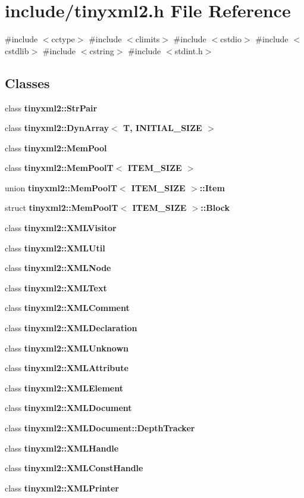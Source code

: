 \section{include/tinyxml2.h File Reference}
\label{tinyxml2_8h}
{\ttfamily \#include $<$cctype$>$}\newline
{\ttfamily \#include $<$climits$>$}\newline
{\ttfamily \#include $<$cstdio$>$}\newline
{\ttfamily \#include $<$cstdlib$>$}\newline
{\ttfamily \#include $<$cstring$>$}\newline
{\ttfamily \#include $<$stdint.\+h$>$}\newline
\subsection*{Classes}
\begin{DoxyCompactItemize}
\item 
class \textbf{ tinyxml2\+::\+Str\+Pair}
\item 
class \textbf{ tinyxml2\+::\+Dyn\+Array$<$ T, I\+N\+I\+T\+I\+A\+L\+\_\+\+S\+I\+Z\+E $>$}
\item 
class \textbf{ tinyxml2\+::\+Mem\+Pool}
\item 
class \textbf{ tinyxml2\+::\+Mem\+Pool\+T$<$ I\+T\+E\+M\+\_\+\+S\+I\+Z\+E $>$}
\item 
union \textbf{ tinyxml2\+::\+Mem\+Pool\+T$<$ I\+T\+E\+M\+\_\+\+S\+I\+Z\+E $>$\+::\+Item}
\item 
struct \textbf{ tinyxml2\+::\+Mem\+Pool\+T$<$ I\+T\+E\+M\+\_\+\+S\+I\+Z\+E $>$\+::\+Block}
\item 
class \textbf{ tinyxml2\+::\+X\+M\+L\+Visitor}
\item 
class \textbf{ tinyxml2\+::\+X\+M\+L\+Util}
\item 
class \textbf{ tinyxml2\+::\+X\+M\+L\+Node}
\item 
class \textbf{ tinyxml2\+::\+X\+M\+L\+Text}
\item 
class \textbf{ tinyxml2\+::\+X\+M\+L\+Comment}
\item 
class \textbf{ tinyxml2\+::\+X\+M\+L\+Declaration}
\item 
class \textbf{ tinyxml2\+::\+X\+M\+L\+Unknown}
\item 
class \textbf{ tinyxml2\+::\+X\+M\+L\+Attribute}
\item 
class \textbf{ tinyxml2\+::\+X\+M\+L\+Element}
\item 
class \textbf{ tinyxml2\+::\+X\+M\+L\+Document}
\item 
class \textbf{ tinyxml2\+::\+X\+M\+L\+Document\+::\+Depth\+Tracker}
\item 
class \textbf{ tinyxml2\+::\+X\+M\+L\+Handle}
\item 
class \textbf{ tinyxml2\+::\+X\+M\+L\+Const\+Handle}
\item 
class \textbf{ tinyxml2\+::\+X\+M\+L\+Printer}
\end{DoxyCompactItemize}
